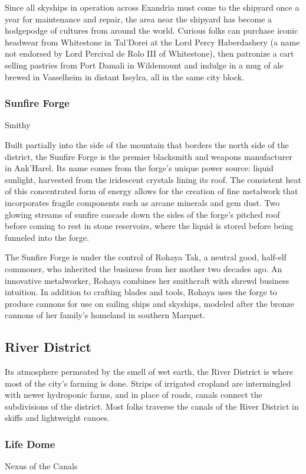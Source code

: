 \documentclass[10pt,a4paper,twoside,twocolumn,openany,nodeprecatedcode]{dndbook}
\begin{document}
Since all skyships in operation across Exandria must come to the shipyard once a year for maintenance and repair, the area near the shipyard has become a hodgepodge of cultures from around the world. Curious folks can purchase iconic headwear from Whitestone in Tal'Dorei at the Lord Percy Haberdashery (a name not endorsed by Lord Percival de Rolo III of Whitestone), then patronize a cart selling pastries from Port Damali in Wildemount and indulge in a mug of ale brewed in Vasselheim in distant Issylra, all in the same city block.

\subsubsection{Sunfire Forge}
Smithy

Built partially into the side of the mountain that borders the north side of the district, the Sunfire Forge is the premier blacksmith and weapons manufacturer in Ank'Harel. Its name comes from the forge's unique power source: liquid sunlight, harvested from the iridescent crystals lining its roof. The consistent heat of this concentrated form of energy allows for the creation of fine metalwork that incorporates fragile components such as arcane minerals and gem dust. Two glowing streams of sunfire cascade down the sides of the forge's pitched roof before coming to rest in stone reservoirs, where the liquid is stored before being funneled into the forge.

The Sunfire Forge is under the control of Rohaya Tak, a neutral good, half-elf commoner, who inherited the business from her mother two decades ago. An innovative metalworker, Rohaya combines her smithcraft with shrewd business intuition. In addition to crafting blades and tools, Rohaya uses the forge to produce cannons for use on sailing ships and skyships, modeled after the bronze cannons of her family's homeland in southern Marquet.

\subsection{River District}
Its atmosphere permeated by the smell of wet earth, the River District is where most of the city's farming is done. Strips of irrigated cropland are intermingled with newer hydroponic farms, and in place of roads, canals connect the subdivisions of the district. Most folks traverse the canals of the River District in skiffs and lightweight canoes.

\subsubsection{Life Dome}
Nexus of the Canals
\end{document}
